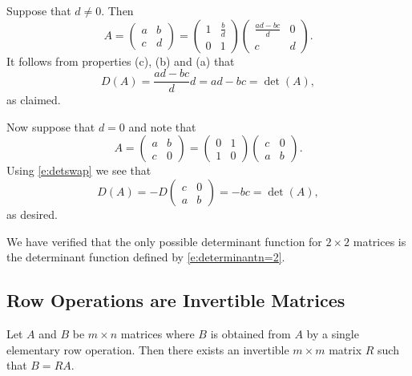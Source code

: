 \documentclass{ximera}
\begin{document}
Suppose that $d\neq 0$.  Then 
\[
A=\left(\begin{array}{cc} a & b\\c & d \end{array}\right) =
\left(\begin{array}{cc} 1 & \frac{b}{d}\\0 & 1 \end{array}\right)
\left(\begin{array}{cc} \frac{ad-bc}{d} & 0\\c & d
\end{array}\right). 
\]
It follows from properties (c), (b) and (a) that
\[
D(A) = \frac{ad-bc}{d}d = ad-bc = \det(A),
\]
as claimed.
 
Now suppose that $d=0$ and note that 
\[
A=\left(\begin{array}{cc} a & b\\c & 0 \end{array}\right) = 
\left(\begin{array}{cc} 0 & 1\\1 & 0 \end{array}\right)
\left(\begin{array}{cc} c & 0\\a & b \end{array}\right).
\]
Using \eqref{e:detswap} we see that 
\[
D(A) = -D \left(\begin{array}{cc} c & 0\\a & b
\end{array}\right) = -bc = \det(A),
\]
as desired. 
 
We have verified that the only possible determinant function for
$2\times 2$ matrices is the determinant function defined by
\eqref{e:determinantn=2}. 
 



\subsection*{Row Operations are Invertible Matrices} 

\begin{proposition}  \label{P:ERO}
Let $A$ and $B$ be $m\times n$ matrices where $B$ is obtained from $A$ by
a single elementary row operation.  Then there exists an invertible 
$m\times m$ matrix $R$ such that $B=RA$.
\end{proposition} 
\end{document}
